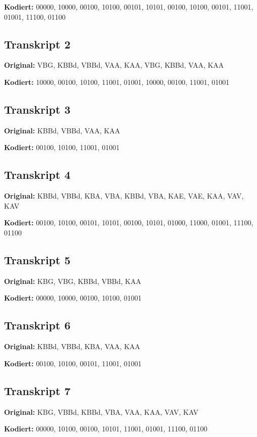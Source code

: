 \documentclass[
  12pt,
  a4paper,
  oneside,
  titlepage
]{article}
\begin{document}
\textbf{Kodiert:} 00000, 10000, 00100, 10100, 00101, 10101, 00100, 10100, 00101, 11001, 01001, 11100, 01100

\subsection{Transkript 2}
\textbf{Original:} VBG, KBBd, VBBd, VAA, KAA, VBG, KBBd, VAA, KAA

\textbf{Kodiert:} 10000, 00100, 10100, 11001, 01001, 10000, 00100, 11001, 01001

\subsection{Transkript 3}
\textbf{Original:} KBBd, VBBd, VAA, KAA

\textbf{Kodiert:} 00100, 10100, 11001, 01001

\subsection{Transkript 4}
\textbf{Original:} KBBd, VBBd, KBA, VBA, KBBd, VBA, KAE, VAE, KAA, VAV, KAV

\textbf{Kodiert:} 00100, 10100, 00101, 10101, 00100, 10101, 01000, 11000, 01001, 11100, 01100

\subsection{Transkript 5}
\textbf{Original:} KBG, VBG, KBBd, VBBd, KAA

\textbf{Kodiert:} 00000, 10000, 00100, 10100, 01001

\subsection{Transkript 6}
\textbf{Original:} KBBd, VBBd, KBA, VAA, KAA

\textbf{Kodiert:} 00100, 10100, 00101, 11001, 01001

\subsection{Transkript 7}
\textbf{Original:} KBG, VBBd, KBBd, VBA, VAA, KAA, VAV, KAV

\textbf{Kodiert:} 00000, 10100, 00100, 10101, 11001, 01001, 11100, 01100
\end{document}
